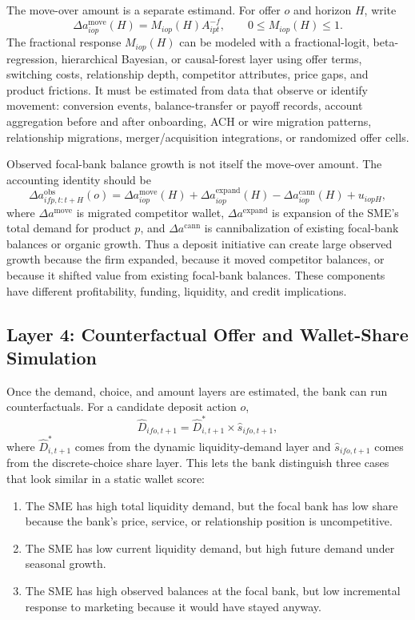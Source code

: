 \documentclass[11pt]{article}
\begin{document}
The move-over amount is a separate estimand. For offer $o$ and horizon $H$,
write
\[
  \Delta a_{iop}^{\mathrm{move}}(H)
  =
  M_{iop}(H)A_{ipt}^{-f},
  \qquad 0\leq M_{iop}(H)\leq 1.
\]
The fractional response $M_{iop}(H)$ can be modeled with a fractional-logit,
beta-regression, hierarchical Bayesian, or causal-forest layer using offer
terms, switching costs, relationship depth, competitor attributes, price gaps,
and product frictions. It must be estimated from data that observe or identify
movement: conversion events, balance-transfer or payoff records, account
aggregation before and after onboarding, ACH or wire migration patterns,
relationship migrations, merger/acquisition integrations, or randomized offer
cells.

Observed focal-bank balance growth is not itself the move-over amount. The
accounting identity should be
\[
  \Delta a_{ifp,t:t+H}^{\mathrm{obs}}(o)
  =
  \Delta a_{iop}^{\mathrm{move}}(H)
  +\Delta a_{iop}^{\mathrm{expand}}(H)
  -\Delta a_{iop}^{\mathrm{cann}}(H)
  +u_{iopH},
\]
where $\Delta a^{\mathrm{move}}$ is migrated competitor wallet,
$\Delta a^{\mathrm{expand}}$ is expansion of the SME's total demand for product
$p$, and $\Delta a^{\mathrm{cann}}$ is cannibalization of existing focal-bank
balances or organic growth. Thus a deposit initiative can create large observed
growth because the firm expanded, because it moved competitor balances, or
because it shifted value from existing focal-bank balances. These components
have different profitability, funding, liquidity, and credit implications.

\subsection{Layer 4: Counterfactual Offer and Wallet-Share Simulation}

Once the demand, choice, and amount layers are estimated, the bank can run
counterfactuals. For a candidate deposit action $o$,
\[
  \widehat{D}_{ifo,t+1}
  =
  \widehat{D}^{*}_{i,t+1}
  \times
  \widehat{s}_{ifo,t+1},
\]
where $\widehat{D}^{*}_{i,t+1}$ comes from the dynamic liquidity-demand layer
and $\widehat{s}_{ifo,t+1}$ comes from the discrete-choice share layer. This
lets the bank distinguish three cases that look similar in a static wallet
score:

\begin{enumerate}[leftmargin=*]
  \item The SME has high total liquidity demand, but the focal bank has low
  share because the bank's price, service, or relationship position is
  uncompetitive.
  \item The SME has low current liquidity demand, but high future demand under
  seasonal growth.
  \item The SME has high observed balances at the focal bank, but low
  incremental response to marketing because it would have stayed anyway.
\end{enumerate}
\end{document}
